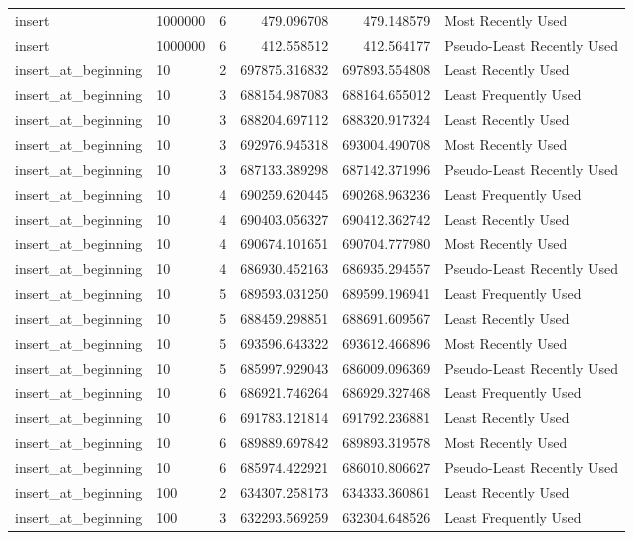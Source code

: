 \begin{tabular}{llrrrl}
insert & 1000000 & 6 & 479.096708 & 479.148579 & Most Recently Used \\
insert & 1000000 & 6 & 412.558512 & 412.564177 & Pseudo-Least Recently Used \\
insert_at_beginning & 10 & 2 & 697875.316832 & 697893.554808 & Least Recently Used \\
insert_at_beginning & 10 & 3 & 688154.987083 & 688164.655012 & Least Frequently Used \\
insert_at_beginning & 10 & 3 & 688204.697112 & 688320.917324 & Least Recently Used \\
insert_at_beginning & 10 & 3 & 692976.945318 & 693004.490708 & Most Recently Used \\
insert_at_beginning & 10 & 3 & 687133.389298 & 687142.371996 & Pseudo-Least Recently Used \\
insert_at_beginning & 10 & 4 & 690259.620445 & 690268.963236 & Least Frequently Used \\
insert_at_beginning & 10 & 4 & 690403.056327 & 690412.362742 & Least Recently Used \\
insert_at_beginning & 10 & 4 & 690674.101651 & 690704.777980 & Most Recently Used \\
insert_at_beginning & 10 & 4 & 686930.452163 & 686935.294557 & Pseudo-Least Recently Used \\
insert_at_beginning & 10 & 5 & 689593.031250 & 689599.196941 & Least Frequently Used \\
insert_at_beginning & 10 & 5 & 688459.298851 & 688691.609567 & Least Recently Used \\
insert_at_beginning & 10 & 5 & 693596.643322 & 693612.466896 & Most Recently Used \\
insert_at_beginning & 10 & 5 & 685997.929043 & 686009.096369 & Pseudo-Least Recently Used \\
insert_at_beginning & 10 & 6 & 686921.746264 & 686929.327468 & Least Frequently Used \\
insert_at_beginning & 10 & 6 & 691783.121814 & 691792.236881 & Least Recently Used \\
insert_at_beginning & 10 & 6 & 689889.697842 & 689893.319578 & Most Recently Used \\
insert_at_beginning & 10 & 6 & 685974.422921 & 686010.806627 & Pseudo-Least Recently Used \\
insert_at_beginning & 100 & 2 & 634307.258173 & 634333.360861 & Least Recently Used \\
insert_at_beginning & 100 & 3 & 632293.569259 & 632304.648526 & Least Frequently Used \\

\end{tabular}
